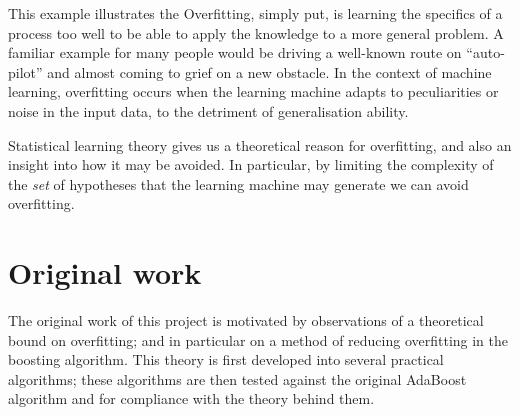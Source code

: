 This example illustrates the 
Overfitting, simply put, is learning the specifics of a process too
well to be able to apply the knowledge to a more general problem.
A familiar example for many people would be driving a well-known route
on ``auto-pilot'' and almost coming to grief on a new obstacle.  In
the context of machine learning, overfitting occurs when the learning
machine adapts to peculiarities or noise in the input data, to the
detriment of generalisation ability.

Statistical learning theory gives us a theoretical reason for
overfitting, and also an insight into how it may be avoided.  In
particular, by limiting the complexity of the \emph{set} of hypotheses
that the learning machine may generate we can avoid overfitting.


\section{Original work}

The original work of this project is motivated by observations of a
theoretical bound on overfitting; and in particular on a method of
reducing overfitting in the boosting algorithm.  This theory is first
developed into several practical algorithms; these algorithms are then
tested against the original AdaBoost algorithm and for compliance with
the theory behind them.





